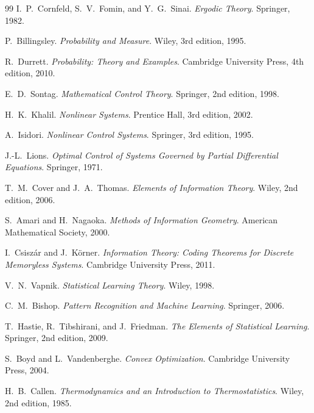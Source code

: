\documentclass[12pt]{book}
\begin{document}
\begin{thebibliography}{99}
I.~P.~Cornfeld, S.~V.~Fomin, and Y.~G.~Sinai.
\textit{Ergodic Theory}.
Springer, 1982.

P.~Billingsley.
\textit{Probability and Measure}.
Wiley, 3rd edition, 1995.

R.~Durrett.
\textit{Probability: Theory and Examples}.
Cambridge University Press, 4th edition, 2010.


E.~D.~Sontag.
\textit{Mathematical Control Theory}.
Springer, 2nd edition, 1998.

H.~K.~Khalil.
\textit{Nonlinear Systems}.
Prentice Hall, 3rd edition, 2002.

A.~Isidori.
\textit{Nonlinear Control Systems}.
Springer, 3rd edition, 1995.

J.-L.~Lions.
\textit{Optimal Control of Systems Governed by Partial Differential Equations}.
Springer, 1971.


T.~M.~Cover and J.~A.~Thomas.
\textit{Elements of Information Theory}.
Wiley, 2nd edition, 2006.

S.~Amari and H.~Nagaoka.
\textit{Methods of Information Geometry}.
American Mathematical Society, 2000.

I.~Csiszár and J.~Körner.
\textit{Information Theory: Coding Theorems for Discrete Memoryless Systems}.
Cambridge University Press, 2011.


V.~N.~Vapnik.
\textit{Statistical Learning Theory}.
Wiley, 1998.

C.~M.~Bishop.
\textit{Pattern Recognition and Machine Learning}.
Springer, 2006.

T.~Hastie, R.~Tibshirani, and J.~Friedman.
\textit{The Elements of Statistical Learning}.
Springer, 2nd edition, 2009.

S.~Boyd and L.~Vandenberghe.
\textit{Convex Optimization}.
Cambridge University Press, 2004.


H.~B.~Callen.
\textit{Thermodynamics and an Introduction to Thermostatistics}.
Wiley, 2nd edition, 1985.


\end{thebibliography}
\end{document}
